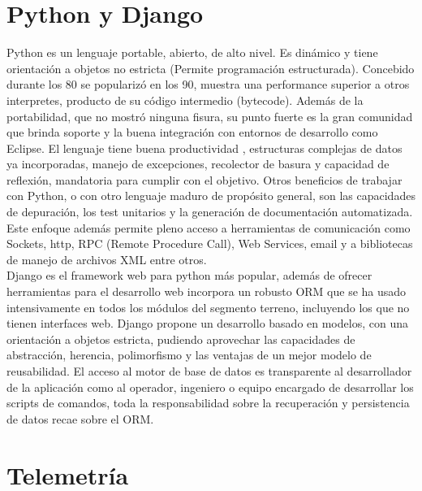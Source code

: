 \documentclass[twoside,twocolumn]{article}
\begin{document}
\section{Python y Django}

Python es un lenguaje portable, abierto, de alto nivel. Es dinámico y tiene 
orientación a objetos no estricta (Permite programación estructurada). 
Concebido durante los 80 se popularizó en los 90, muestra una performance 
superior a otros interpretes, producto de su código intermedio (bytecode). 
Además de la portabilidad, que no mostró ninguna fisura, su punto fuerte es la 
gran comunidad que brinda soporte y la buena integración con entornos de 
desarrollo como Eclipse.  El lenguaje tiene buena productividad 
\cite{prechelt2000empirical}, estructuras complejas de datos ya incorporadas, 
manejo de excepciones, recolector de basura y capacidad de reflexión, mandatoria 
para cumplir con el objetivo. Otros beneficios de trabajar con Python, o con 
otro lenguaje maduro de propósito general, son las capacidades de depuración, 
los test unitarios y la generación de documentación automatizada. Este enfoque 
además permite pleno acceso a herramientas de comunicación como Sockets, http, 
RPC (Remote Procedure Call), Web Services, email y a bibliotecas de manejo de 
archivos XML entre otros. \\
Django es el framework web para python más popular, además de ofrecer 
herramientas para el desarrollo web incorpora un robusto ORM que se ha usado 
intensivamente en todos los módulos del segmento terreno, incluyendo los que no 
tienen interfaces web. Django propone un desarrollo basado en modelos, con una 
orientación a objetos estricta, pudiendo aprovechar las capacidades de 
abstracción, herencia, polimorfismo y las ventajas de un mejor modelo de 
reusabilidad. El acceso al motor de base de datos es transparente al 
desarrollador de la aplicación como al operador, ingeniero o equipo encargado 
de desarrollar los scripts de comandos, toda la responsabilidad sobre la 
recuperación y persistencia de datos recae sobre el ORM.  


\section{Telemetría}
\label{sec:telemetria}
\end{document}
